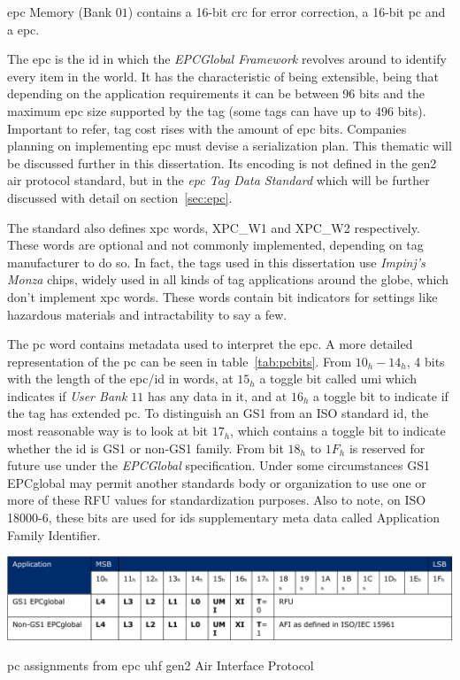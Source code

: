 \ac{epc} Memory (Bank $01$) contains a 16-bit \ac{crc} for error correction, a 16-bit \ac{pc} and a \ac{epc}.

The \ac{epc} is the \ac{id} in which the \emph{EPCGlobal Framework} revolves around to identify every item in the world. It has the characteristic of being extensible, being that depending on the application requirements it can be between 96 bits and the maximum \ac{epc} size supported by the tag (some tags can have up to 496 bits). Important to refer, tag cost rises with the amount of \ac{epc} bits. Companies planning on implementing \ac{epc} must devise a serialization plan. This thematic will be discussed further in this dissertation.
Its encoding is not defined in the \ac{gen2} air protocol standard, but in the \emph{\ac{epc} Tag Data Standard} which will be further discussed with detail on section~\ref{sec:epc}.

The standard also defines \ac{xpc} words, XPC\_W1 and XPC\_W2 respectively. These words are optional and not commonly implemented, depending on tag manufacturer to do so. In fact, the tags used in this dissertation use \textit{Impinj's Monza} chips, widely used in all kinds of tag applications around the globe, which don't implement \ac{xpc} words. These words contain bit indicators for settings like hazardous materials and intractability to say a few.

The \ac{pc} word contains metadata used to interpret the \ac{epc}. A more detailed representation of the \ac{pc} can be seen in table~\ref{tab:pcbits}.
From $10_h-14_h$, 4 bits with the length of the \ac{epc}/\ac{id} in words, at $15_h$ a toggle bit called \ac{umi} which indicates if \emph{User Bank $11$} has any data in it, and at $16_h$ a toggle bit to indicate if the tag has extended \ac{pc}.
To distinguish an GS1 from an ISO standard \ac{id}, the most reasonable way is to look at bit $17_h$, which contains a toggle bit to indicate whether the \ac{id} is GS1 or non-GS1 family.
From bit $18_h$ to $1F_h$ is reserved for future use under the \emph{EPCGlobal} specification. Under some circumstances GS1 EPCglobal may permit another standards body or organization to use one or more of these RFU values for standardization purposes. Also to note, on ISO 18000-6, these bits are used for \acp{id} supplementary meta data called Application Family Identifier.

\begin{table}
    \centering
    \includegraphics[width=\textwidth]{./figs/02-state-of-the-art/table_pcbits.pdf}
    \caption{\ac{pc} assignments from \ac{epc} \ac{uhf} \ac{gen2} Air Interface Protocol~\cite{UHFGen2Tag}} 
    \label{tab:pcbits}
\end{table}

